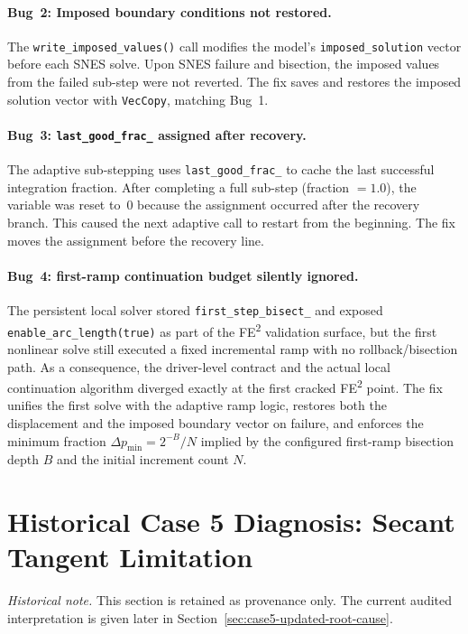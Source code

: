 \paragraph{Bug~2: Imposed boundary conditions not restored.}
The \texttt{write\_imposed\_values()} call modifies the model's
\texttt{imposed\_solution} vector before each SNES solve.  Upon
SNES failure and bisection, the imposed values from the failed
sub-step were not reverted.  The fix saves and restores the imposed
solution vector with \texttt{VecCopy}, matching Bug~1.

\paragraph{Bug~3: \texttt{last\_good\_frac\_} assigned after recovery.}
The adaptive sub-stepping uses \texttt{last\_good\_frac\_} to cache the
last successful integration fraction.  After completing a full sub-step
(fraction $= 1.0$), the variable was reset to~$0$ because the
assignment occurred after the recovery branch.  This caused the next
adaptive call to restart from the beginning.  The fix moves the
assignment before the recovery line.

\paragraph{Bug~4: first-ramp continuation budget silently ignored.}
The persistent local solver stored \texttt{first\_step\_bisect\_} and exposed
\texttt{enable\_arc\_length(true)} as part of the FE\textsuperscript{2}
validation surface, but the first nonlinear solve still executed a fixed
incremental ramp with no rollback/bisection path.  As a consequence, the
driver-level contract and the actual local continuation algorithm diverged
exactly at the first cracked FE\textsuperscript{2} point.  The fix unifies the
first solve with the adaptive ramp logic, restores both the displacement and
the imposed boundary vector on failure, and enforces the minimum fraction
\(\Delta p_{\min} = 2^{-B}/N\) implied by the configured first-ramp
bisection depth \(B\) and the initial increment count \(N\).


\section{Historical Case 5 Diagnosis: Secant Tangent Limitation}
\label{sec:case5-failure}

\noindent\textit{Historical note.} This section is retained as provenance only.
The current audited interpretation is given later in
Section~\ref{sec:case5-updated-root-cause}.

